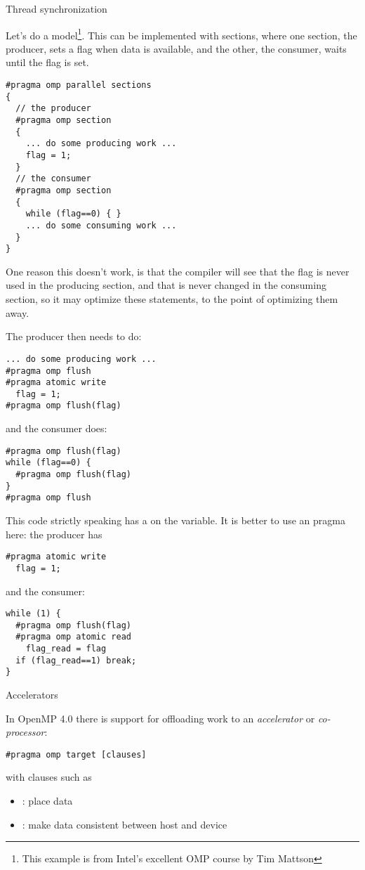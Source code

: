 {Thread synchronization}

Let's do a  model\footnote{This example
  is from Intel's excellent OMP course by Tim Mattson}.  This can be
implemented with sections, where one section, the producer, sets a
flag when data is available, and the other, the consumer, waits until
the flag is set.
\begin{verbatim}
#pragma omp parallel sections
{
  // the producer
  #pragma omp section
  {
    ... do some producing work ...
    flag = 1;
  }
  // the consumer
  #pragma omp section
  {
    while (flag==0) { }
    ... do some consuming work ...
  }
}
\end{verbatim}
One reason this doesn't work, is that the compiler will see that the flag is never used
in the producing section, and that is never changed in the consuming section, so
it may optimize these statements, to the point of optimizing them away.

The producer then needs to do:
\begin{verbatim}
... do some producing work ...
#pragma omp flush
#pragma atomic write
  flag = 1;
#pragma omp flush(flag)
\end{verbatim}
and the consumer does:
\begin{verbatim}
#pragma omp flush(flag)
while (flag==0) {
  #pragma omp flush(flag)
}
#pragma omp flush
\end{verbatim}
This code strictly speaking has a  on the  variable.
It is better to use an  pragma here: the producer has
\begin{verbatim}
#pragma atomic write
  flag = 1;
\end{verbatim}
and the consumer:
\begin{verbatim}
while (1) {
  #pragma omp flush(flag)
  #pragma omp atomic read
    flag_read = flag
  if (flag_read==1) break;
}
\end{verbatim}

 {Accelerators}

In OpenMP 4.0 there is support for offloading work to an
\emph{accelerator}
or
\emph{co-processor}:
\begin{verbatim}
#pragma omp target [clauses]
\end{verbatim}
with clauses such as
\begin{itemize}
\item {}: place data
\item {}: make data consistent between host and device
\end{itemize}

